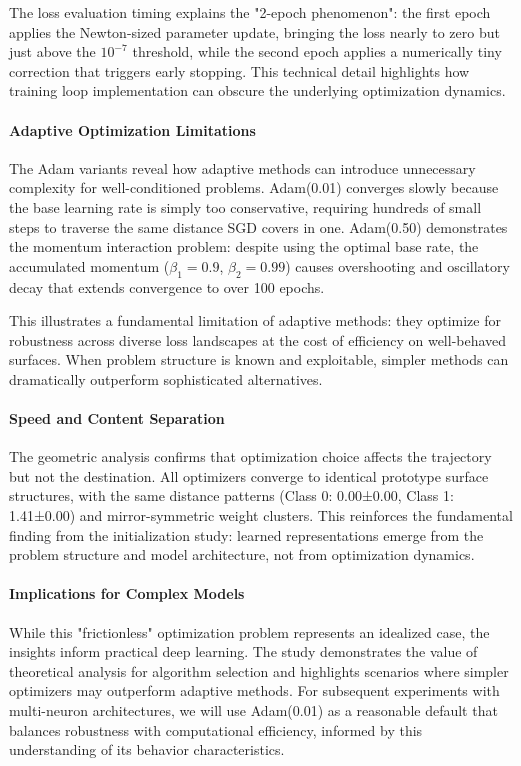 The loss evaluation timing explains the "2-epoch phenomenon": the first epoch applies the Newton-sized parameter update, bringing the loss nearly to zero but just above the $10^{-7}$ threshold, while the second epoch applies a numerically tiny correction that triggers early stopping. This technical detail highlights how training loop implementation can obscure the underlying optimization dynamics.

\paragraph{Adaptive Optimization Limitations}
The Adam variants reveal how adaptive methods can introduce unnecessary complexity for well-conditioned problems. Adam(0.01) converges slowly because the base learning rate is simply too conservative, requiring hundreds of small steps to traverse the same distance SGD covers in one. Adam(0.50) demonstrates the momentum interaction problem: despite using the optimal base rate, the accumulated momentum ($\beta_1=0.9$, $\beta_2=0.99$) causes overshooting and oscillatory decay that extends convergence to over 100 epochs.

This illustrates a fundamental limitation of adaptive methods: they optimize for robustness across diverse loss landscapes at the cost of efficiency on well-behaved surfaces. When problem structure is known and exploitable, simpler methods can dramatically outperform sophisticated alternatives.

\paragraph{Speed and Content Separation}
The geometric analysis confirms that optimization choice affects the trajectory but not the destination. All optimizers converge to identical prototype surface structures, with the same distance patterns (Class 0: 0.00±0.00, Class 1: 1.41±0.00) and mirror-symmetric weight clusters. This reinforces the fundamental finding from the initialization study: learned representations emerge from the problem structure and model architecture, not from optimization dynamics.

\paragraph{Implications for Complex Models}
While this "frictionless" optimization problem represents an idealized case, the insights inform practical deep learning. The study demonstrates the value of theoretical analysis for algorithm selection and highlights scenarios where simpler optimizers may outperform adaptive methods. For subsequent experiments with multi-neuron architectures, we will use Adam(0.01) as a reasonable default that balances robustness with computational efficiency, informed by this understanding of its behavior characteristics.

